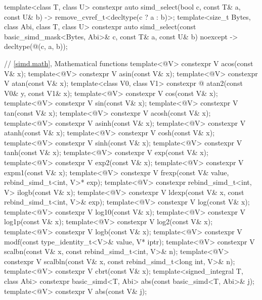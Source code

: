 \begin{codeblock}
{  template<class T, class U>
    constexpr auto simd_select(bool c, const T& a, const U& b)
    -> remove_cvref_t<decltype(c ? a : b)>;
  template<size_t Bytes, class Abi, class T, class U>
    constexpr auto simd_select(const basic_simd_mask<Bytes, Abi>& c, const T& a, const U& b)
    noexcept -> decltype(@\simdselect@(c, a, b));

  // \ref{simd.math}, Mathematical functions
  template<@\mathfloatingpoint@ V> constexpr V acos(const V& x);
  template<@\mathfloatingpoint@ V> constexpr V asin(const V& x);
  template<@\mathfloatingpoint@ V> constexpr V atan(const V& x);
  template<class V0, class V1>
    constexpr @ atan2(const V0& y, const V1& x);
  template<@\mathfloatingpoint@ V> constexpr V cos(const V& x);
  template<@\mathfloatingpoint@ V> constexpr V sin(const V& x);
  template<@\mathfloatingpoint@ V> constexpr V tan(const V& x);
  template<@\mathfloatingpoint@ V> constexpr V acosh(const V& x);
  template<@\mathfloatingpoint@ V> constexpr V asinh(const V& x);
  template<@\mathfloatingpoint@ V> constexpr V atanh(const V& x);
  template<@\mathfloatingpoint@ V> constexpr V cosh(const V& x);
  template<@\mathfloatingpoint@ V> constexpr V sinh(const V& x);
  template<@\mathfloatingpoint@ V> constexpr V tanh(const V& x);
  template<@\mathfloatingpoint@ V> constexpr V exp(const V& x);
  template<@\mathfloatingpoint@ V> constexpr V exp2(const V& x);
  template<@\mathfloatingpoint@ V> constexpr V expm1(const V& x);
  template<@\mathfloatingpoint@ V> constexpr V frexp(const V& value, rebind_simd_t<int, V>* exp);
  template<@\mathfloatingpoint@ V> constexpr rebind_simd_t<int, V> ilogb(const V& x);
  template<@\mathfloatingpoint@ V> constexpr V ldexp(const V& x, const rebind_simd_t<int, V>& exp);
  template<@\mathfloatingpoint@ V> constexpr V log(const V& x);
  template<@\mathfloatingpoint@ V> constexpr V log10(const V& x);
  template<@\mathfloatingpoint@ V> constexpr V log1p(const V& x);
  template<@\mathfloatingpoint@ V> constexpr V log2(const V& x);
  template<@\mathfloatingpoint@ V> constexpr V logb(const V& x);
  template<@\mathfloatingpoint@ V> constexpr V modf(const type_identity_t<V>& value, V* iptr);
  template<@\mathfloatingpoint@ V> constexpr V scalbn(const V& x, const rebind_simd_t<int, V>& n);
  template<@\mathfloatingpoint@ V>
    constexpr V scalbln(const V& x, const rebind_simd_t<long int, V>& n);
  template<@\mathfloatingpoint@ V> constexpr V cbrt(const V& x);
  template<signed_integral T, class Abi>
    constexpr basic_simd<T, Abi> abs(const basic_simd<T, Abi>& j);
  template<@\mathfloatingpoint@ V> constexpr V abs(const V& j);
}
\end{codeblock}

